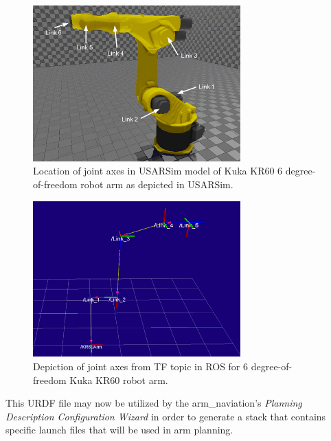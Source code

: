 \begin{figure}[t!]
\centering
\includegraphics[width=8cm]{Figures/Robots/KR60Profile.jpg}
\caption{Location of joint axes in USARSim model of Kuka KR60 6 degree-of-freedom robot arm as depicted in USARSim.}
\label{Fig:KR60Anotated}
\end{figure}

\begin{figure}[t!]
\centering
\includegraphics[width=8cm]{Figures/ROS/rviz1.png}
\caption{Depiction of joint axes from TF topic in ROS for 6 degree-of-freedom Kuka KR60 robot arm.}
\label{Fig:KR60TF}
\end{figure}

This URDF file may now be utilized by the arm\_naviation's {\it Planning Description Configuration Wizard} in order to generate a stack that contains specific launch files that will be used in arm planning.